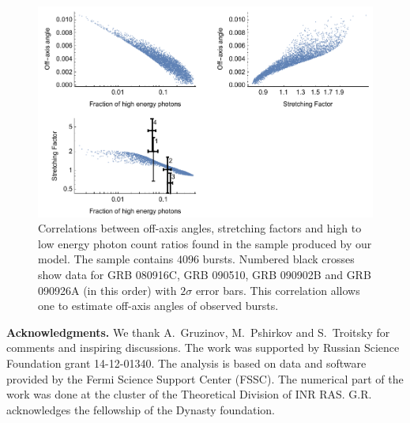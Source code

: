 \documentclass{article}
\begin{document}
\begin{figure}
        \centering
        \includegraphics[width=1.0\textwidth]{correlations}
        \caption{
        	Correlations between off-axis angles, stretching factors and high to low energy photon count ratios found in the sample produced by our model.
        	The sample contains $4096$ bursts.
        	Numbered black crosses show data for GRB 080916C, GRB 090510, GRB 090902B and GRB 090926A (in this order) with $2\sigma$ error bars.
        	This correlation allows one to estimate off-axis angles of observed bursts.
        }
        \label{fig:correlations}
\end{figure}

{\bf Acknowledgments.} We thank A.~Gruzinov, M.~Pshirkov and
S.~Troitsky for comments and inspiring discussions.  The work was
supported by Russian Science Foundation grant 14-12-01340. The
analysis is based on data and software provided by the Fermi Science
Support Center (FSSC). The numerical part of the work was done at the
cluster of the Theoretical Division of INR RAS. G.R. acknowledges the
fellowship of the Dynasty foundation.
\end{document}
